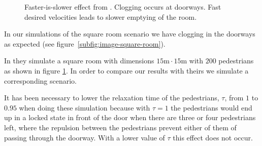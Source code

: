 \begin{figure}[ht]
    \centering
    \caption[Faster-is-slower effect from \cite{helbing00}]{Faster-is-slower 
    effect from \cite{helbing00}.  Clogging 
    occurs at doorways.  Fast desired 
    velocities leads to slower emptying of the room.}
    \label{fig:LtNFasterIsSlower}
\end{figure}

In our simulations of the square room scenario we have clogging in the 
doorways as expected (see figure~\ref{subfig:image-square-room}). 

In \cite{helbing00} they simulate a square room with dimensions 
$15\text{m} \cdot 15\text{m}$ with $200$ pedestrians as shown in 
figure \ref{fig:LtNFasterIsSlower}. In order to compare our results 
with theirs we simulate a corresponding scenario.

It has been necessary to lower the relaxation time of the pedestrians, $\tau$, 
from $1$ to $0.95$ when doing these simulation because with $\tau = 1$ the 
pedestrians would end up in a locked state in front of the door when there are 
three or four pedestrians left, where the repulsion between the pedestrians 
prevent either of them of passing through the doorway. With a lower value of 
$\tau$ this effect does not occur. 


